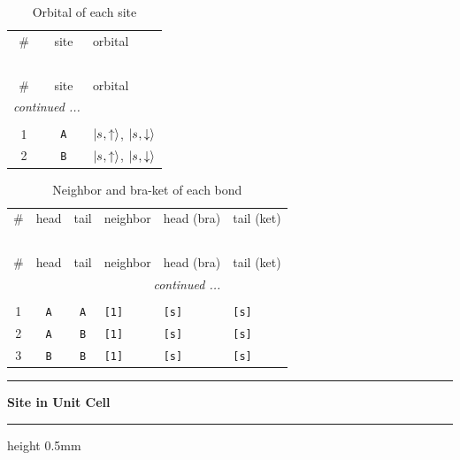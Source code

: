 \documentclass[fleqn,10pt,landscape]{jsarticle}
\begin{document}
\renewcommand{\arraystretch}{1.6}
\begin{longtable}[l]{ccl}
\captionsetup{justification=raggedright, singlelinecheck=off}
\caption{Orbital of each site}
 \\
 \hline \hline
\# & site & orbital \\ \hline \endfirsthead

\multicolumn{2}{l}{\tablename\ \thetable{}} \\
 \hline \hline
\# & site & orbital \\ \hline \endhead

 \hline \hline
\multicolumn{2}{r}{\footnotesize\it continued ...} \\ \endfoot

 \hline \hline
\multicolumn{2}{r}{} \\ \endlastfoot

1 & \texttt{A} & $\ket{s_{},\uparrow}$, $\ket{s_{},\downarrow}$ \\ \hline
2 & \texttt{B} & $\ket{s_{},\uparrow}$, $\ket{s_{},\downarrow}$ \\
\end{longtable}
\renewcommand{\arraystretch}{1.6}
\begin{longtable}[l]{ccclll}
\captionsetup{justification=raggedright, singlelinecheck=off}
\caption{Neighbor and bra-ket of each bond}
 \\
 \hline \hline
\# & head & tail & neighbor & head (bra) & tail (ket) \\ \hline \endfirsthead

\multicolumn{5}{l}{\tablename\ \thetable{}} \\
 \hline \hline
\# & head & tail & neighbor & head (bra) & tail (ket) \\ \hline \endhead

 \hline \hline
\multicolumn{5}{r}{\footnotesize\it continued ...} \\ \endfoot

 \hline \hline
\multicolumn{5}{r}{} \\ \endlastfoot

1 & \texttt{A} & \texttt{A} & \texttt{[1]} & \texttt{[s]} & \texttt{[s]} \\ \hline
2 & \texttt{A} & \texttt{B} & \texttt{[1]} & \texttt{[s]} & \texttt{[s]} \\ \hline
3 & \texttt{B} & \texttt{B} & \texttt{[1]} & \texttt{[s]} & \texttt{[s]} \\
\end{longtable}
\vspace{5mm}
\noindent \rule[0.5mm]{5mm}{0.5mm}\hspace{3mm}\textbf{Site in Unit Cell}\hspace{3mm}\leaders\hrule height 0.5mm\hfill\kern0pt
\vspace{3mm}
\end{document}
